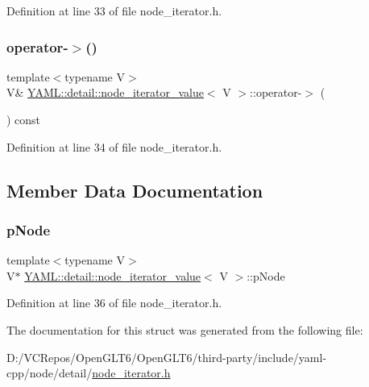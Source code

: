 Definition at line 33 of file node\+\_\+iterator.\+h.

\mbox{\label{struct_y_a_m_l_1_1detail_1_1node__iterator__value_ae8033063a711760583672207cc6dbd52}} 
\subsubsection{\texorpdfstring{operator-\/$>$()}{operator->()}}
{\footnotesize\ttfamily template$<$typename V$>$ \\
V\& \mbox{\hyperlink{struct_y_a_m_l_1_1detail_1_1node__iterator__value}{Y\+A\+M\+L\+::detail\+::node\+\_\+iterator\+\_\+value}}$<$ V $>$\+::operator-\/$>$ (\begin{DoxyParamCaption}{ }\end{DoxyParamCaption}) const\hspace{0.3cm}{\ttfamily [inline]}}



Definition at line 34 of file node\+\_\+iterator.\+h.



\subsection{Member Data Documentation}
\mbox{\label{struct_y_a_m_l_1_1detail_1_1node__iterator__value_a298d03aed3b8da100a1025d6aed34b1b}} 
\subsubsection{\texorpdfstring{pNode}{pNode}}
{\footnotesize\ttfamily template$<$typename V$>$ \\
V$\ast$ \mbox{\hyperlink{struct_y_a_m_l_1_1detail_1_1node__iterator__value}{Y\+A\+M\+L\+::detail\+::node\+\_\+iterator\+\_\+value}}$<$ V $>$\+::p\+Node}



Definition at line 36 of file node\+\_\+iterator.\+h.



The documentation for this struct was generated from the following file\+:\begin{DoxyCompactItemize}
\item 
D\+:/\+V\+C\+Repos/\+Open\+G\+L\+T6/\+Open\+G\+L\+T6/third-\/party/include/yaml-\/cpp/node/detail/\mbox{\hyperlink{node__iterator_8h}{node\+\_\+iterator.\+h}}\end{DoxyCompactItemize}
